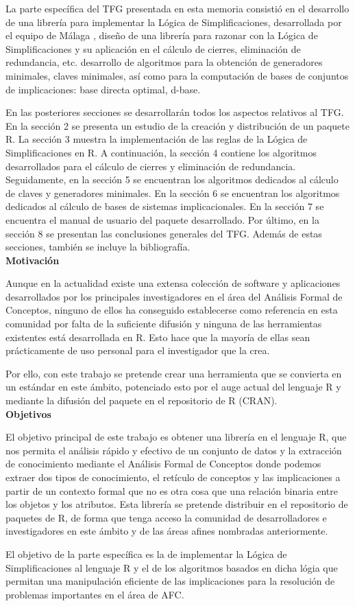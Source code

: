 La parte espec\'ifica del TFG presentada en esta memoria consisti\'o en el desarrollo de una librer\'ia para implementar la L\'ogica de Simplificaciones, desarrollada por el equipo de M\'alaga \cite{Cordero2002}, dise\~no de una librer\'ia para razonar con la L\'ogica de Simplificaciones y su aplicaci\'on en el c\'alculo de cierres, eliminaci\'on de redundancia, etc. desarrollo de algoritmos para la obtenci\'on de generadores minimales, claves minimales, as\'i como para la computaci\'on de bases de conjuntos de implicaciones: base directa optimal, d-base. 

En las posteriores secciones se desarrollar\'an todos los aspectos relativos al TFG. En la secci\'on 2 se presenta un estudio de la creaci\'on y distribuci\'on de un paquete R. La secci\'on 3 muestra la implementaci\'on de las reglas de la L\'ogica de Simplificaciones en R. A continuaci\'on, la secci\'on 4 contiene los algoritmos desarrollados para el c\'alculo de cierres y eliminaci\'on de redundancia. Seguidamente, en la secci\'on 5 se encuentran los algoritmos dedicados al c\'alculo de claves y generadores minimales. En la secci\'on 6 se encuentran los algoritmos dedicados al c\'alculo de bases de sistemas implicacionales. En la secci\'on 7 se encuentra el manual de usuario del paquete desarrollado. Por \'ultimo, en la secci\'on 8 se presentan las conclusiones generales del TFG. Adem\'as de estas secciones, tambi\'en se incluye la bibliograf\'ia.\\

\textbf{Motivaci\'on}

Aunque en la actualidad existe una extensa colecci\'on de software y aplicaciones desarrollados por los principales investigadores en el \'area del  An\'alisis Formal de Conceptos, ninguno de ellos ha conseguido establecerse como referencia en esta comunidad por falta de la suficiente difusi\'on y ninguna de las herramientas existentes est\'a desarrollada en R. Esto hace que la mayor\'ia de ellas sean pr\'acticamente de uso personal para el investigador que la crea. 

Por ello, con este trabajo se pretende crear una herramienta que se convierta en un est\'andar en este \'ambito, potenciado esto por el auge actual del lenguaje R y mediante la difusi\'on del paquete en el repositorio de R (CRAN).\\


\textbf{Objetivos}

El objetivo principal de este trabajo es obtener una librer\'ia en el lenguaje R, que nos permita el an\'alisis r\'apido y efectivo de un conjunto de datos y la extracci\'on de conocimiento mediante el An\'alisis Formal de Conceptos donde podemos extraer dos tipos de conocimiento, el ret\'iculo de conceptos y las implicaciones a partir de un contexto formal que no es otra cosa que una relaci\'on binaria entre los objetos y los atributos. Esta librer\'ia se pretende distribuir en el repositorio de paquetes de R, de forma que tenga acceso la comunidad de desarrolladores e investigadores en este \'ambito y de las \'areas afines nombradas anteriormente. 

El objetivo de la parte espec\'ifica es la de implementar la L\'ogica de Simplificaciones al lenguaje R y el de los algoritmos basados en dicha l\'ogia que permitan una manipulaci\'on eficiente de las implicaciones para la resoluci\'on de problemas importantes en el \'area de AFC.

\newpage
